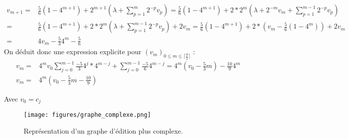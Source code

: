 \documentclass[12pt, twoside]{report}
\begin{document}
\begin{equation}
    \begin{split}
        v_{m+1} = & \frac{5}{6}(1-4^{m+1}) + 2^{m+1}\left(\lambda + \sum_{p=1}^{m} 2^{-p}v_p\right) = \frac{5}{6}(1-4^{m+1}) + 2*2^{m}\left(\lambda + 2^{-m}v_m + \sum_{p=1}^{m-1} 2^{-p}v_p\right) \\
        = & \frac{5}{6}(1-4^{m+1}) + 2*2^{m}\left(\lambda + \sum_{p=1}^{m-1} 2^{-p}v_p\right) + 2v_m = \frac{5}{6}(1-4^{m+1}) + 2*(v_m - \frac{5}{6}(1-4^{m})) + 2v_m \\
        = & 4v_m - \frac{5}{3}4^m - \frac{5}{6}
    \end{split}
\end{equation}
On déduit donc une expression explicite pour $(v_m)_{0\leq m \leq \lceil \frac{d}{2} \rceil}$ :
\begin{equation}
    \begin{split}
        v_m = & 4^mv_0 \sum_{j=0}^{m-1}\frac{-5}{3}4^j * 4^{m-j} + \sum_{j=0}^{m-1}\frac{-5}{6}4^{m-j} = 4^m(v_0 -\frac{5}{3}m) - \frac{10}{9}4^m\\
        v_m = & 4^m(v_0 -\frac{5}{3}m -\frac{10}{9})
    \end{split}
\end{equation}

Avec $v_0=c_{j}$

\begin{figure}[h]{} 
    \centering
    \texttt{[image: figures/graphe\_complexe.png]}
    \caption{Représentation d'un graphe d'édition plus complexe.}
\end{figure} \label{fig:complex_graph}
\end{document}
